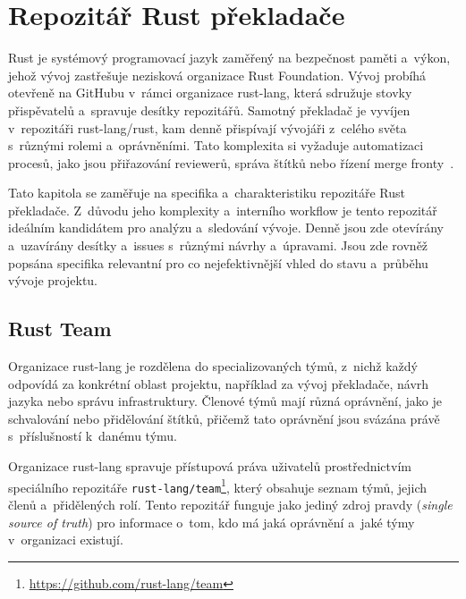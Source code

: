 
\chapter{Repozitář Rust překladače}
\label{chap:rust_repository}

Rust je systémový programovací jazyk zaměřený na bezpečnost paměti a~výkon, jehož vývoj zastřešuje nezisková organizace Rust Foundation. Vývoj probíhá otevřeně na GitHubu v~rámci organizace rust-lang, která sdružuje stovky přispěvatelů a~spravuje desítky repozitářů. Samotný překladač je vyvíjen v~repozitáři rust-lang/rust, kam denně přispívají vývojáři z~celého světa s~různými rolemi a~oprávněními. Tato komplexita si vyžaduje automatizaci procesů, jako jsou přiřazování reviewerů, správa štítků nebo řízení merge fronty~\cite{rust_foundation,rust_lang_org}.

Tato kapitola se zaměřuje na specifika a~charakteristiku repozitáře Rust překladače. Z~důvodu jeho komplexity a~interního workflow je tento repozitář ideálním kandidátem pro analýzu a~sledování vývoje. Denně jsou zde otevírány a~uzavírány desítky \PR a~issues s~různými návrhy a~úpravami. Jsou zde rovněž popsána specifika relevantní pro co nejefektivnější vhled do stavu a~průběhu vývoje projektu.

\section{Rust Team \API}
\label{sec:rust_team_api}

Organizace rust-lang je rozdělena do specializovaných týmů, z~nichž každý odpovídá za konkrétní oblast projektu, například za vývoj překladače, návrh jazyka nebo správu infrastruktury. Členové týmů mají různá oprávnění, jako je schvalování \PR nebo přidělování štítků, přičemž tato oprávnění jsou svázána právě s~příslušností k~danému týmu.

Organizace rust-lang spravuje přístupová práva uživatelů prostřednictvím speciálního repozitáře \texttt{rust-lang/team}\footnote{\url{https://github.com/rust-lang/team}}, který obsahuje seznam týmů, jejich členů a~přidělených rolí. Tento repozitář funguje jako jediný zdroj pravdy (\textit{single source of truth}) pro informace o~tom, kdo má jaká oprávnění a~jaké týmy v~organizaci existují.

